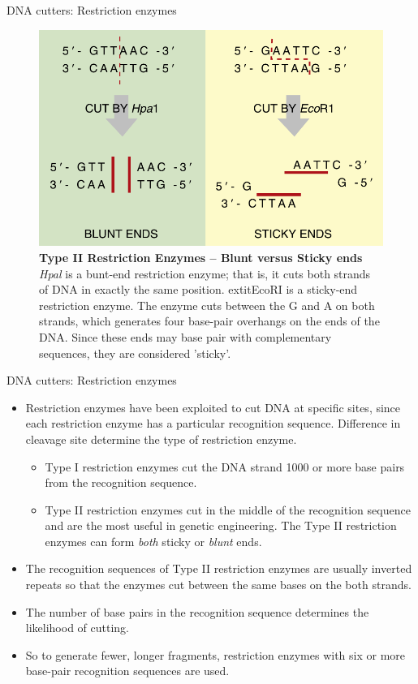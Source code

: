 \documentclass[
  ignorenonframetext,
  aspectratio=169]{beamer}
\providecommand{\tightlist}{%
  \setlength{\itemsep}{0pt}\setlength{\parskip}{0pt}}
\begin{document}
\begin{frame}{DNA cutters: Restriction enzymes}
\protect\hypertarget{dna-cutters-restriction-enzymes-1}{}
\begin{figure}
\includegraphics[width=0.5\linewidth]{./../images/restriction_enzymes} \caption{\textbf{Type II Restriction Enzymes -- Blunt versus Sticky ends} \newline \textit{Hpal} is a bunt-end restriction enzyme; that is, it cuts both strands of DNA in exactly the same position.    extit{EcoR}I is a sticky-end restriction enzyme. The enzyme cuts between the G and A on both strands, which generates four base-pair overhangs on the ends of the DNA. Since these ends may base pair with complementary sequences, they are considered 'sticky'.}\label{fig:restriction-enzymes}
\end{figure}
\end{frame}

\begin{frame}{DNA cutters: Restriction enzymes}
\protect\hypertarget{dna-cutters-restriction-enzymes-2}{}
\footnotesize

\begin{itemize}
\item
  Restriction enzymes have been exploited to cut DNA at specific sites,
  since each restriction enzyme has a particular recognition sequence.
  Difference in cleavage site determine the type of restriction enzyme.

  \begin{itemize}
  \tightlist
  \item
    Type I restriction enzymes cut the DNA strand 1000 or more base
    pairs from the recognition sequence.
  \item
    Type II restriction enzymes cut in the middle of the recognition
    sequence and are the most useful in genetic engineering. The Type II
    restriction enzymes can form \emph{both} sticky or \emph{blunt}
    ends.
  \end{itemize}
\item
  The recognition sequences of Type II restriction enzymes are usually
  inverted repeats so that the enzymes cut between the same bases on the
  both strands.
\item
  The number of base pairs in the recognition sequence determines the
  likelihood of cutting.
\item
  So to generate fewer, longer fragments, restriction enzymes with six
  or more base-pair recognition sequences are used.
\end{itemize}
\end{frame}
\end{document}

